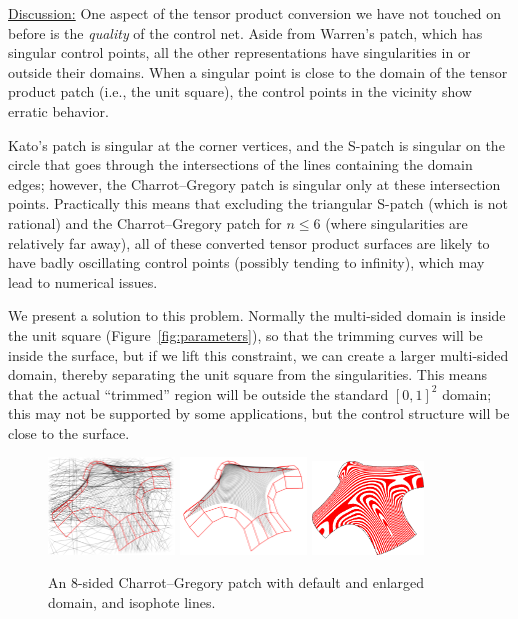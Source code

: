 \documentclass{article}
\begin{document}
\vspace{10pt}
\noindent\underline{Discussion:}\vspace{0.2em}\newline
One aspect of the tensor product conversion we have not touched on before is the \emph{quality}
of the control net. Aside from Warren's patch, which has singular control points,
all the other representations have singularities in or outside their domains.
When a singular point is close to the domain of the tensor product patch (i.e., the unit square),
the control points in the vicinity show erratic behavior.

Kato's patch is singular at the corner vertices, and the S-patch is singular on the circle that goes
through the intersections of the lines containing the domain edges; however, the Charrot--Gregory patch
is singular only at these intersection points. Practically this means that excluding the triangular
S-patch (which is not rational) and the Charrot--Gregory patch for $n\leq6$ (where singularities are
relatively far away), all of these converted tensor product surfaces are likely to have
badly oscillating control points (possibly tending to infinity), which may lead to numerical issues.

We present a solution to this problem. Normally the multi-sided domain is inside the unit
square (Figure~\ref{fig:parameters}), so that the trimming curves will be inside the
surface, but if we lift this constraint, we can create a larger multi-sided domain,
thereby separating the unit square from the singularities. This means that the actual ``trimmed''
region will be outside the standard $[0,1]^2$ domain; this may not be supported by some
applications, but the control structure will be close to the surface.
\begin{figure}[h!]
  {
    \hfill
    \includegraphics[width = 0.3\textwidth]{images/8sided-1.png}
    \hfill
    \includegraphics[width = 0.3\textwidth]{images/8sided-2.png}
    \hfill
    \includegraphics[width = 0.265\textwidth]{images/8sided-3.png}
    \hfill
  }
  \caption{An 8-sided Charrot--Gregory patch with default and enlarged domain, and isophote lines.}
\end{figure}
\end{document}

